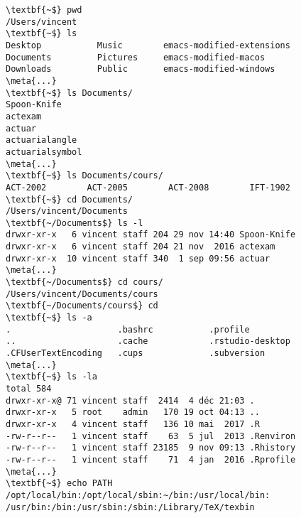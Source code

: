 \begin{exercice}
\begin{sol}
\begin{Schunk}
\begin{Verbatim}[commandchars=\\\{\}]
\textbf{~$} pwd
/Users/vincent
\textbf{~$} ls
Desktop           Music        emacs-modified-extensions
Documents         Pictures     emacs-modified-macos
Downloads         Public       emacs-modified-windows
\meta{...}
\textbf{~$} ls Documents/
Spoon-Knife
actexam
actuar
actuarialangle
actuarialsymbol
\meta{...}
\textbf{~$} ls Documents/cours/
ACT-2002        ACT-2005        ACT-2008        IFT-1902
\textbf{~$} cd Documents/
/Users/vincent/Documents
\textbf{~/Documents$} ls -l
drwxr-xr-x   6 vincent staff 204 29 nov 14:40 Spoon-Knife
drwxr-xr-x   6 vincent staff 204 21 nov  2016 actexam
drwxr-xr-x  10 vincent staff 340  1 sep 09:56 actuar
\meta{...}
\textbf{~/Documents$} cd cours/
/Users/vincent/Documents/cours
\textbf{~/Documents/cours$} cd
\textbf{~$} ls -a
.                     .bashrc           .profile
..                    .cache            .rstudio-desktop
.CFUserTextEncoding   .cups             .subversion
\meta{...}
\textbf{~$} ls -la
total 584
drwxr-xr-x@ 71 vincent staff  2414  4 déc 21:03 .
drwxr-xr-x   5 root    admin   170 19 oct 04:13 ..
drwxr-xr-x   4 vincent staff   136 10 mai  2017 .R
-rw-r--r--   1 vincent staff    63  5 jul  2013 .Renviron
-rw-r--r--   1 vincent staff 23185  9 nov 09:13 .Rhistory
-rw-r--r--   1 vincent staff    71  4 jan  2016 .Rprofile
\meta{...}
\textbf{~$} echo PATH
/opt/local/bin:/opt/local/sbin:~/bin:/usr/local/bin:
/usr/bin:/bin:/usr/sbin:/sbin:/Library/TeX/texbin
\end{Verbatim}
    \end{Schunk} %
  \end{sol}
\end{exercice}

